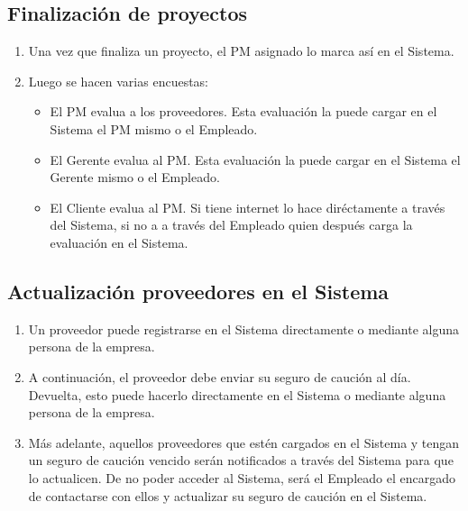 \subsection{Finalización de proyectos}
\begin{enumerate}
    \item Una vez que finaliza un proyecto, el PM asignado lo marca así en el Sistema.
    \item Luego se hacen varias encuestas:
        \begin{itemize}
            \item El PM evalua a los proveedores. Esta evaluación la puede cargar en el Sistema el PM mismo o el Empleado.
            \item El Gerente evalua al PM. Esta evaluación la puede cargar en el Sistema el Gerente mismo o el Empleado.
            \item El Cliente evalua al PM. Si tiene internet lo hace diréctamente a través del Sistema, si no a a través del Empleado quien después carga la evaluación en el Sistema.
        \end{itemize}
\end{enumerate}

\subsection{Actualización proveedores en el Sistema}
\begin{enumerate}
    \item Un proveedor puede registrarse en el Sistema directamente o mediante alguna persona de la empresa.
    \item A continuación, el proveedor debe enviar su seguro de caución al día. Devuelta, esto puede hacerlo directamente en el Sistema o mediante alguna persona de la empresa.
    \item Más adelante, aquellos proveedores que estén cargados en el Sistema y tengan un seguro de caución vencido serán notificados a través del Sistema para que lo actualicen.
      De no poder acceder al Sistema, será el Empleado el encargado de contactarse con ellos y actualizar su seguro de caución en el Sistema.
\end{enumerate}
